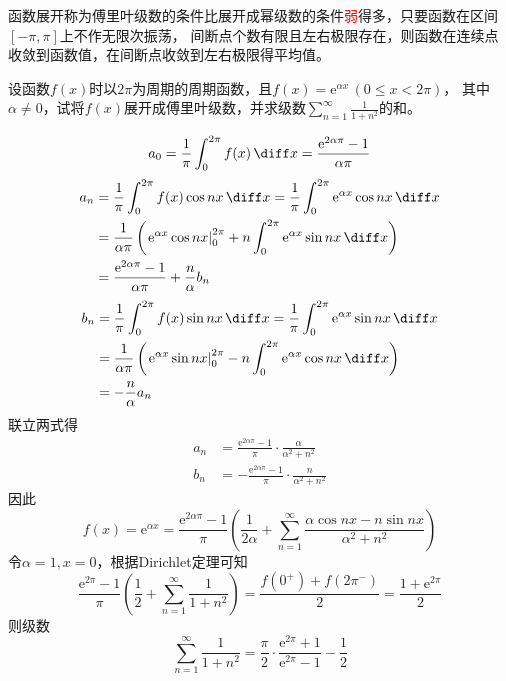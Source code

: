函数展开称为傅里叶级数的条件比展开成幂级数的条件\textcolor{red}{弱}得多，只要函数在区间$[-\pi,\pi]$上不作无限次振荡，
间断点个数有限且左右极限存在，则函数在连续点收敛到函数值，在间断点收敛到左右极限得平均值。

\begin{example}
    设函数$f(x)$时以$2\pi$为周期的周期函数，且$f(x)=\mathrm{e}^{\alpha x}\,(0\leq x<2\pi)$，
    其中$\alpha\neq 0$，试将$f(x)$展开成傅里叶级数，并求级数$\displaystyle\sum_{n=1}^\infty\frac{1}{1+n^2}$的和。
\end{example}
\begin{solution}
    \[ a_0 = \frac{1}{\pi}\int_0^{2\pi} f(x)\,\diff x = \frac{\mathrm{e}^{2\alpha\pi} - 1}{\alpha\pi}\]
    \begin{align*}
        a_n & = \frac{1}{\pi}\int_0^{2\pi} f(x)\cos nx\,\diff x = \frac{1}{\pi}\int_0^{2\pi} \mathrm{e}^{\alpha x}\cos nx\,\diff x                         \\
            & =\frac{1}{\alpha\pi} \left(\left.\mathrm{e}^{\alpha x}\cos nx\right|_0^{2\pi} + n\int_0^{2\pi} \mathrm{e}^{\alpha x}\sin nx\,\diff x \right) \\
            & =\frac{\mathrm{e}^{2\alpha\pi} - 1}{\alpha\pi} +  \frac{n}{\alpha}b_n
    \end{align*}
    \begin{align*}
        b_n & = \frac{1}{\pi}\int_0^{2\pi} f(x)\sin nx\,\diff x = \frac{1}{\pi}\int_0^{2\pi} \mathrm{e}^{\alpha x}\sin nx\,\diff x                         \\
            & =\frac{1}{\alpha\pi} \left(\left.\mathrm{e}^{\alpha x}\sin nx\right|_0^{2\pi} - n\int_0^{2\pi} \mathrm{e}^{\alpha x}\cos nx\,\diff x \right) \\
            & =-\frac{n}{\alpha}a_n
    \end{align*}
    联立两式得
    \begin{align*}
        a_n & = \frac{\mathrm{e}^{2\alpha\pi}-1}{\pi} \cdot \frac{\alpha}{\alpha^2+n^2} \\
        b_n & = -\frac{\mathrm{e}^{2\alpha\pi}-1}{\pi} \cdot \frac{n}{\alpha^2+n^2}
    \end{align*}
    因此
    \[
        f(x) = \mathrm{e}^{\alpha x}
        = \frac{\mathrm{e}^{2\alpha\pi} - 1}{\pi}
        \left(\frac{1}{2\alpha} + \sum_{n=1}^\infty \frac{\alpha\cos nx - n\sin nx}{\alpha^2+n^2}\right)
    \]
    令$\alpha=1,x=0$，根据Dirichlet定理可知
    \[
        \frac{\mathrm{e}^{2\pi} - 1}{\pi}\left(\frac{1}{2}+ \sum_{n=1}^\infty \frac{1}{1+n^2}\right)
        =
        \frac{f(0^+)+f(2\pi^-)}{2}
        =
        \frac{1+\mathrm{e}^{2\pi}}{2}
    \]
    则级数
    \[ \sum_{n=1}^\infty \frac{1}{1+n^2} = \frac{\pi}{2}\cdot\frac{\mathrm{e}^{2\pi}+1}{\mathrm{e}^{2\pi}-1} - \frac{1}{2} \]
\end{solution}


